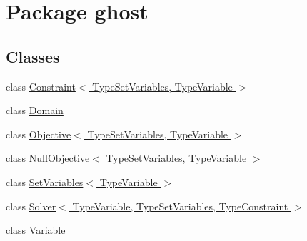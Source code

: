 \hypertarget{namespaceghost}{\section{Package ghost}
\label{namespaceghost}
}
\subsection*{Classes}
\begin{DoxyCompactItemize}
\item 
class \hyperlink{classghost_1_1Constraint_3_01TypeSetVariables_00_01TypeVariable_01_4}{Constraint$<$ Type\-Set\-Variables, Type\-Variable $>$}
\item 
class \hyperlink{classghost_1_1Domain}{Domain}
\item 
class \hyperlink{classghost_1_1Objective_3_01TypeSetVariables_00_01TypeVariable_01_4}{Objective$<$ Type\-Set\-Variables, Type\-Variable $>$}
\item 
class \hyperlink{classghost_1_1NullObjective_3_01TypeSetVariables_00_01TypeVariable_01_4}{Null\-Objective$<$ Type\-Set\-Variables, Type\-Variable $>$}
\item 
class \hyperlink{classghost_1_1SetVariables_3_01TypeVariable_01_4}{Set\-Variables$<$ Type\-Variable $>$}
\item 
class \hyperlink{classghost_1_1Solver_3_01TypeVariable_00_01TypeSetVariables_00_01TypeConstraint_01_4}{Solver$<$ Type\-Variable, Type\-Set\-Variables, Type\-Constraint $>$}
\item 
class \hyperlink{classghost_1_1Variable}{Variable}
\end{DoxyCompactItemize}
